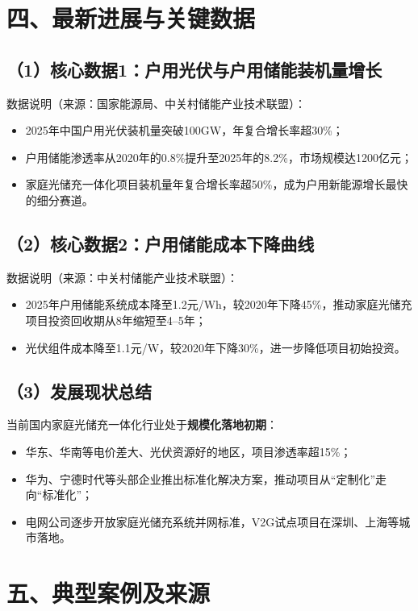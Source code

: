 \documentclass[12pt,a4paper,UTF8]{ctexart}
\begin{document}
\section*{四、最新进展与关键数据}
\subsection*{（1）核心数据1：户用光伏与户用储能装机量增长}
数据说明（来源：国家能源局、中关村储能产业技术联盟）：
\begin{itemize}
    \item 2025年中国户用光伏装机量突破100GW，年复合增长率超30\%；
    \item 户用储能渗透率从2020年的0.8\%提升至2025年的8.2\%，市场规模达1200亿元；
    \item 家庭光储充一体化项目装机量年复合增长率超50\%，成为户用新能源增长最快的细分赛道。
\end{itemize}

\subsection*{（2）核心数据2：户用储能成本下降曲线}
数据说明（来源：中关村储能产业技术联盟）：
\begin{itemize}
    \item 2025年户用储能系统成本降至1.2元/Wh，较2020年下降45\%，推动家庭光储充项目投资回收期从8年缩短至4--5年；
    \item 光伏组件成本降至1.1元/W，较2020年下降30\%，进一步降低项目初始投资。
\end{itemize}

\subsection*{（3）发展现状总结}
当前国内家庭光储充一体化行业处于\textbf{规模化落地初期}：
\begin{itemize}
    \item 华东、华南等电价差大、光伏资源好的地区，项目渗透率超15\%；
    \item 华为、宁德时代等头部企业推出标准化解决方案，推动项目从“定制化”走向“标准化”；
    \item 电网公司逐步开放家庭光储充系统并网标准，V2G试点项目在深圳、上海等城市落地。
\end{itemize}

\section*{五、典型案例及来源}
\end{document}
